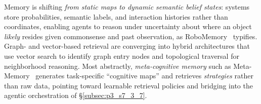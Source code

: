 Memory is shifting \emph{from static maps to dynamic semantic belief states}: systems store probabilities, semantic labels, and interaction histories rather than coordinates, enabling agents to reason under uncertainty about where an object \emph{likely} resides given commonsense and past observation, as RoboMemory~\cite{lei2025robomemory} typifies.
Graph- and vector-based retrieval are converging into hybrid architectures that use vector search to identify graph entry nodes and topological traversal for neighborhood reasoning.
Most abstractly, \emph{meta-cognitive memory} such as Meta-Memory~\cite{mao2025meta} generates task-specific ``cognitive maps'' and retrieves \emph{strategies} rather than raw data, pointing toward learnable retrieval policies and bridging into the agentic orchestration of §\ref{subsec:p3_s7_3_7}.
